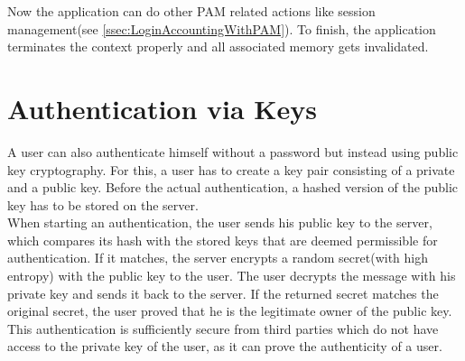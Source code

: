 \documentclass[10pt,a4paper,titlepage,twoside,english,final]{zhawreprt}
\begin{document}
Now the application can do other \gls{PAM} related actions like session management(see \ref{ssec:LoginAccountingWithPAM}). To finish, the application terminates the context properly and all associated memory gets invalidated.

\section{Authentication via Keys}\label{sec:AuthViaKeys}
A user can also authenticate himself without a password but instead using public key cryptography. For this, a user has to create a key pair consisting of a private and a public key. Before the actual authentication, a hashed version of the public key has to be stored on the server.\\
When starting an authentication, the user sends his public key to the server, which compares its hash with the stored keys that are deemed permissible for authentication. If it matches, the server encrypts a random secret(with high entropy) with the public key to the user. The user decrypts the message with his private key and sends it back to the server. If the returned secret matches the original secret, the user proved that he is the legitimate owner of the public key.\\
This authentication is sufficiently secure from third parties which do not have access to the private key of the user, as it can prove the authenticity of a user.
\end{document}
